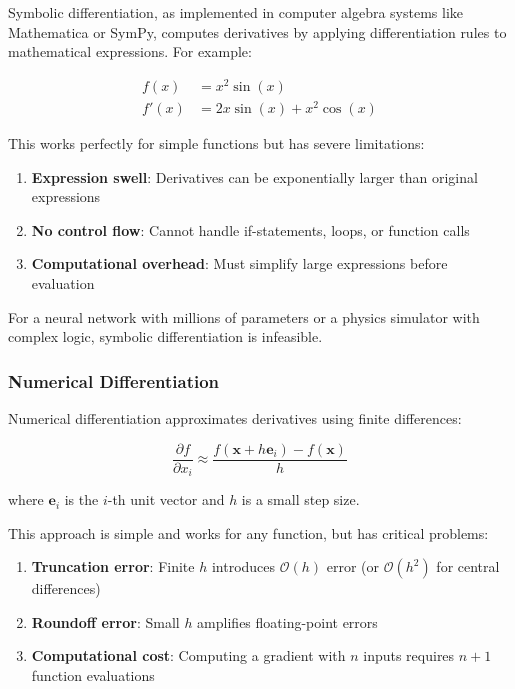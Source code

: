 Symbolic differentiation, as implemented in computer algebra systems like Mathematica or SymPy, computes derivatives by applying differentiation rules to mathematical expressions. For example:

\begin{align}
f(x) &= x^2 \sin(x) \\
f'(x) &= 2x \sin(x) + x^2 \cos(x)
\end{align}

This works perfectly for simple functions but has severe limitations:

\begin{enumerate}
    \item \textbf{Expression swell}: Derivatives can be exponentially larger than original expressions
    \item \textbf{No control flow}: Cannot handle if-statements, loops, or function calls
    \item \textbf{Computational overhead}: Must simplify large expressions before evaluation
\end{enumerate}

For a neural network with millions of parameters or a physics simulator with complex logic, symbolic differentiation is infeasible.

\subsubsection{Numerical Differentiation}

Numerical differentiation approximates derivatives using finite differences:

\begin{equation}
\frac{\partial f}{\partial x_i} \approx \frac{f(\mathbf{x} + h\mathbf{e}_i) - f(\mathbf{x})}{h}
\label{eq:forward_diff}
\end{equation}

where $\mathbf{e}_i$ is the $i$-th unit vector and $h$ is a small step size.

This approach is simple and works for any function, but has critical problems:

\begin{enumerate}
    \item \textbf{Truncation error}: Finite $h$ introduces $\mathcal{O}(h)$ error (or $\mathcal{O}(h^2)$ for central differences)
    \item \textbf{Roundoff error}: Small $h$ amplifies floating-point errors
    \item \textbf{Computational cost}: Computing a gradient with $n$ inputs requires $n+1$ function evaluations
\end{enumerate}

